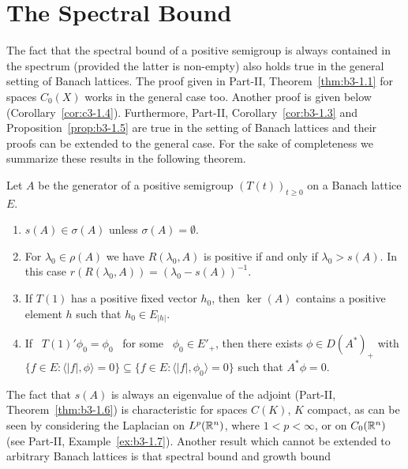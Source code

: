 \section{The Spectral Bound}\label{sec:c3-1}
The fact that the spectral bound of a positive semigroup is always contained in the spectrum (provided the latter  is non-empty) also holds true in the general setting of Banach lattices.
The proof given in Part-II, Theorem~\ref{thm:b3-1.1} for spaces $C_{0}(X)$ works in the general case too.
Another proof is given below (\cf Corollary~\ref{cor:c3-1.4}).
Furthermore, 
Part-II, Corollary~\ref{cor:b3-1.3} and Proposition~\ref{prop:b3-1.5} 
are true in the setting of Banach lattices and their proofs can be extended to the general case.
For the sake of completeness we summarize these results in the following theorem.
\begin{theorem}\label{thm:c3-1.1}
Let $A$ be the generator of a positive semigroup $(T(t))_{t \geq 0}$ on a Banach lattice $E$.
	\begin{enumerate}[\upshape (i)]
		\item 
		$s(A) \in \sigma(A)$ unless $\sigma(A) = \emptyset$.
		
		\item 
		For $\lambda_{0} \in \rho(A)$ we have
		$R(\lambda_{0},A)$ is positive if and only if\/ $\lambda_{0} > s(A)$.
		In this case $r(R(\lambda_{0},A)) = (\lambda_{0} - s(A))^{-1}$.
		
		\item 
		If\/ $T(1)$ has a positive fixed vector $h_{0}$, then $\ker(A)$ contains a positive element $h$ such that $h_{0} \in E_{|h|}$.

		\item 
		If \ $T(1)'\phi_{0} = \phi_{0}$ \ for some \ $\phi_{0} \in E'_{+}$, then there exists $\phi \in D(A^*)_{+}$ with $\{f \in E \colon \langle |f|,\phi\rangle = 0\} \subseteq \{f \in E \colon \langle |f|,\phi_{0}\rangle = 0\}$ such that $A^*\phi = 0$.
	\end{enumerate}
\end{theorem}
The fact that $s(A)$ is always an eigenvalue of the adjoint (\cf Part-II, Theorem~\ref{thm:b3-1.6}) is characteristic for spaces $C(K)$, $K$ compact, as can be seen by considering the Laplacian on $L^p(\mathbb{R}^n)$, where $1 < p < \infty$, or on $C_{0}(\mathbb{R}^n)$ (see Part-II, Example~\ref{ex:b3-1.7}).
Another result which cannot be extended to arbitrary Banach lattices is that spectral bound and growth bound%
